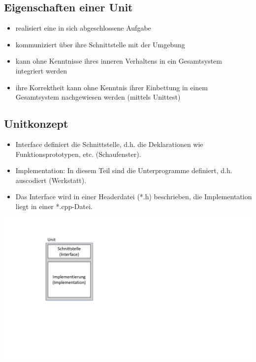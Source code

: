 \subsection{Eigenschaften einer Unit}
\begin{itemize}
	\item realisiert eine in sich abgeschlossene Aufgabe
	\item kommuniziert über ihre Schnittstelle mit der Umgebung
	\item kann ohne Kenntnisse ihres inneren Verhaltens in ein Gesamtsystem integriert werden
	\item ihre Korrektheit kann ohne Kenntnis ihrer Einbettung in einem Gesamtsystem nachgewiesen werden (mittels Unittest)
\end{itemize}

\subsection{Unitkonzept}
\vspace{-\baselineskip}
\begin{minipage}{0.6\linewidth}
	\begin{itemize}
		\item Interface definiert die Schnittstelle, d.h. die Deklarationen wie Funktionsprototypen, etc. (Schaufenster).
		\item Implementation: In diesem Teil sind die Unterprogramme definiert, d.h. auscodiert (Werkstatt).
		\item Das Interface wird in einer Headerdatei (*.h) beschrieben, die Implementation liegt in einer *.cpp-Datei.
	\end{itemize}
\end{minipage}
\hspace{0.05\linewidth}
\begin{minipage}{0.15\linewidth}
	\includegraphics[width=\linewidth]{images/unit1.pdf}
\end{minipage}

